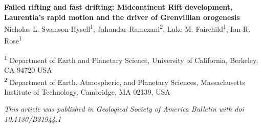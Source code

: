 \documentclass[11pt,letterpaper]{article}
\begin{document}
\begin{flushleft}
{\Large \textbf{Failed rifting and fast drifting: Midcontinent Rift development, Laurentia's rapid motion and the driver of Grenvillian orogenesis}}
\\

Nicholas L. Swanson-Hysell\textsuperscript{1},
Jahandar Ramezani\textsuperscript{2},
Luke M. Fairchild\textsuperscript{1},
Ian R. Rose\textsuperscript{1}

\bigskip

\textsuperscript{1} Department of Earth and Planetary Science, University of California, Berkeley, CA 94720 USA
\\
\textsuperscript{2} Department of Earth, Atmospheric, and Planetary Sciences, Massachusetts Institute of Technology, Cambridge, MA 02139, USA
\bigskip

\end{flushleft}

\noindent\textit{This article was published in Geological Society of America Bulletin with doi 10.1130/B31944.1}

\end{document}
